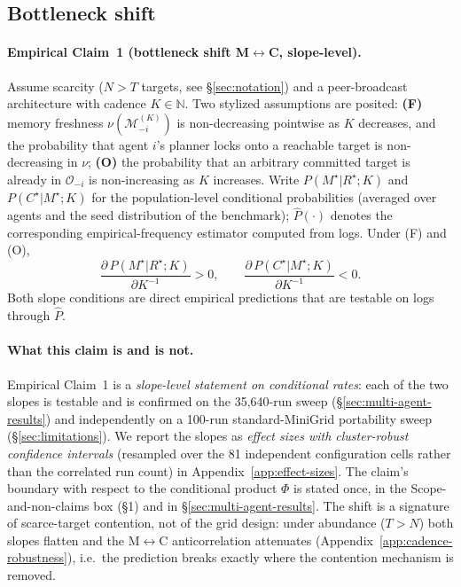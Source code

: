 \documentclass{article}
\begin{document}
\subsection{Bottleneck shift}
\label{sec:shift}

\paragraph{Empirical Claim~1 (bottleneck shift M$\leftrightarrow$C, slope-level).}
Assume scarcity ($N > T$ targets, see \S\ref{sec:notation}) and a
peer-broadcast architecture with cadence $K \in \mathbb{N}$. Two
stylized assumptions are posited:
\textbf{(F)} memory freshness $\nu(\mathcal{M}_{-i}^{(K)})$ is
non-decreasing pointwise as $K$ decreases, and the probability that
agent $i$'s planner locks onto a reachable target is non-decreasing in
$\nu$;
\textbf{(O)} the probability that an arbitrary committed target is
already in $\mathcal{O}_{-i}$ is non-increasing as $K$ increases.
Write $P(M^\star|R^\star;K)$ and $P(C^\star|M^\star;K)$ for the
population-level conditional probabilities (averaged over agents and
the seed distribution of the benchmark); $\hat{P}(\cdot)$ denotes the
corresponding empirical-frequency estimator computed from logs. Under
(F) and (O),
\[
\frac{\partial\, P(M^\star|R^\star;K)}{\partial K^{-1}} > 0,
\qquad
\frac{\partial\, P(C^\star|M^\star;K)}{\partial K^{-1}} < 0.
\]
Both slope conditions are direct empirical predictions that are
testable on logs through $\hat{P}$.

\paragraph{What this claim is and is not.}
Empirical Claim~1 is a \emph{slope-level statement on conditional rates}: each of the two slopes is testable and is confirmed on the 35{,}640-run sweep (\S\ref{sec:multi-agent-results}) and independently on a 100-run standard-MiniGrid portability sweep (\S\ref{sec:limitations}). We report the slopes as \emph{effect sizes with cluster-robust confidence intervals} (resampled over the 81 independent configuration cells rather than the correlated run count) in Appendix~\ref{app:effect-sizes}. The claim's boundary with respect to the conditional product $\Phi$ is stated once, in the Scope-and-non-claims box (\S1) and in \S\ref{sec:multi-agent-results}. The shift is a signature of scarce-target contention, not of the grid design: under abundance ($T{>}N$) both slopes flatten and the M$\leftrightarrow$C anticorrelation attenuates (Appendix~\ref{app:cadence-robustness}), i.e.\ the prediction breaks exactly where the contention mechanism is removed.
\end{document}
